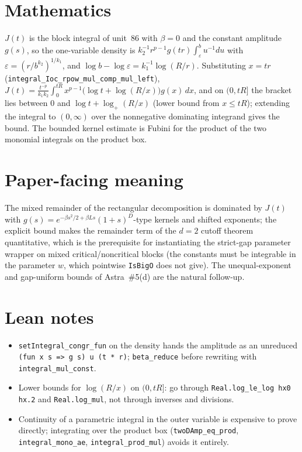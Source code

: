 \documentclass[11pt]{article}
\begin{document}
\section{Mathematics}

$J(t)$ is the block integral of unit~86 with $\beta=0$ and the constant amplitude $g(s)$, so the
one-variable density is $k_2^{-1}r^{p-1}g(tr)\int_\varepsilon^bu^{-1}du$ with
$\varepsilon=(r/b^{k_2})^{1/k_1}$, and $\log b-\log\varepsilon=k_1^{-1}\log(R/r)$. Substituting
$x=tr$ (\texttt{integral\_Ioc\_rpow\_mul\_comp\_mul\_left}),
$J(t)=\frac{t^{-p}}{k_1k_2}\int_0^{tR}x^{p-1}\bigl(\log t+\log(R/x)\bigr)g(x)\,dx$, and on $(0,tR]$
the bracket lies between $0$ and $\log t+\log_+(R/x)$ (lower bound from $x\le tR$); extending the
integral to $(0,\infty)$ over the nonnegative dominating integrand gives the bound. The bounded
kernel estimate is Fubini for the product of the two monomial integrals on the product box.

\section{Paper-facing meaning}

The mixed remainder of the rectangular decomposition is dominated by
$J(t)$ with $g(s)=e^{-\beta s^2/2+\beta Ls}(1+s)^D$-type kernels and shifted exponents; the explicit
bound makes the remainder term of the $d=2$ cutoff theorem quantitative, which is the prerequisite
for instantiating the strict-gap parameter wrapper on mixed critical/noncritical blocks (the
constants must be integrable in the parameter $w$, which pointwise \texttt{IsBigO} does not give).
The unequal-exponent and gap-uniform bounds of Astra~\#5(d) are the natural follow-up.

\section{Lean notes}

\begin{itemize}
\item \texttt{setIntegral\_congr\_fun} on the density hands the amplitude as an unreduced
\texttt{(fun x s => g s) u (t * r)}; \texttt{beta\_reduce} before rewriting with
\texttt{integral\_mul\_const}.
\item Lower bounds for $\log(R/x)$ on $(0,tR]$: go through
\texttt{Real.log\_le\_log hx0 hx.2} and \texttt{Real.log\_mul}, not through inverses and divisions.
\item Continuity of a parametric integral in the outer variable is expensive to prove directly;
integrating over the product box (\texttt{twoDAmp\_eq\_prod}, \texttt{integral\_mono\_ae},
\texttt{integral\_prod\_mul}) avoids it entirely.
\end{itemize}
\end{document}
